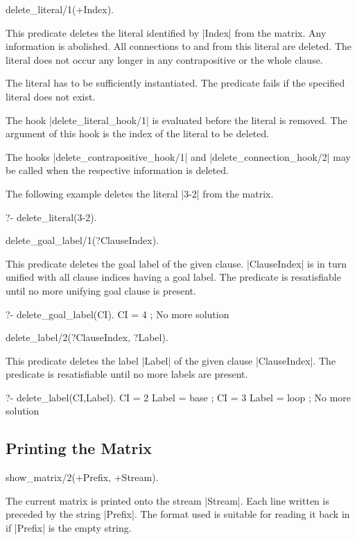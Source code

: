 \Predicate delete_literal/1(+Index).

This predicate deletes the literal identified by |Index| from the matrix. Any
information is abolished. All connections to and from this literal are
deleted. The literal does not occur any longer in any contrapositive or the
whole clause.

The literal has to be sufficiently instantiated. The predicate fails if the
specified literal does not exist.

The hook |delete_literal_hook/1| is evaluated before the literal is removed.
The argument of this hook is the index of the literal to be deleted.

The hooks |delete_contrapositive_hook/1| and |delete_connection_hook/2| may be
called when the respective information is deleted.

The following example deletes the literal |3-2| from the matrix.
\begin{BoxedSample}
  ?- delete\_literal(3-2).
\end{BoxedSample}

\Predicate delete_goal_label/1(?ClauseIndex).

This predicate deletes the goal label of the given clause. |ClauseIndex| is in
turn unified with all clause indices having a goal label. The   predicate is
resatisfiable until no more unifying goal clause is present.
\begin{BoxedSample}
  ?- delete\_goal\_label(CI).
  CI = 4
  ;
  No more solution
\end{BoxedSample}

\Predicate delete_label/2(?ClauseIndex, ?Label).

This predicate deletes the label |Label| of the given clause |ClauseIndex|.
The predicate is resatisfiable until no more labels are present.
\begin{BoxedSample}
  ?- delete\_label(CI,Label).
  CI = 2
  Label = base
  ;
  CI = 3
  Label = loop
  ;
  No more solution
\end{BoxedSample}


\subsection{Printing the Matrix}

\Predicate show_matrix/2(+Prefix, +Stream).

The current matrix is printed onto the stream |Stream|.  Each line written is
preceded by the string |Prefix|.  The format used is suitable for reading it
back in if |Prefix| is the empty string.

